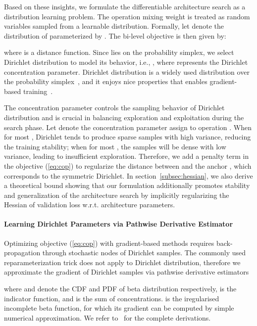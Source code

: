 \documentclass{article} \usepackage{iclr2021_conference,times}
\begin{document}
Based on these insights, we formulate the differentiable architecture search as a distribution learning problem.
The operation mixing weight  is treated as random variables sampled from a learnable distribution.
Formally, let  denote the distribution of  parameterized by .
The bi-level objective is then given by:


where  is a distance function.
Since  lies on the probability simplex, we select Dirichlet distribution to model its behavior, i.e., , where  represents the Dirichlet concentration parameter.
Dirichlet distribution is a widely used distribution over the probability simplex~\citep{drvae, lda, ndp, bcl}, and it enjoys nice properties that enables gradient-based training~\citep{pathwise}.

The concentration parameter  controls the sampling behavior of Dirichlet distribution and is crucial in balancing exploration and exploitation during the search phase.
Let  denote the concentration parameter assign to operation .
When  for most , Dirichlet tends to produce sparse samples with high variance, reducing the training stability; when  for most , the samples will be dense with low variance, leading to insufficient exploration.
Therefore, we add a penalty term in the objective (\ref{eq:cop}) to regularize the distance between  and the anchor , which corresponds to the symmetric Dirichlet.
In section~\ref{subsec:hessian}, we also derive a theoretical bound showing that our formulation additionally promotes stability and generalization of the architecture search by implicitly regularizing the Hessian of validation loss w.r.t. architecture parameters.

\paragraph{Learning Dirichlet Parameters via Pathwise Derivative Estimator}
Optimizing objective (\ref{eq:cop}) with gradient-based methods requires back-propagation through stochastic nodes of Dirichlet samples.
The commonly used reparameterization trick does not apply to Dirichlet distribution,
therefore we approximate the gradient of Dirichlet samples via pathwise derivative estimators~\citep{pathwise}

where  and  denote the CDF and PDF of beta distribution respectively,  is the indicator function, and  is the sum of concentrations.
 is the iregularised incomplete beta function, for which its gradient can be computed by simple numerical approximation.
We refer to~\citep{pathwise} for the complete derivations.
\end{document}
